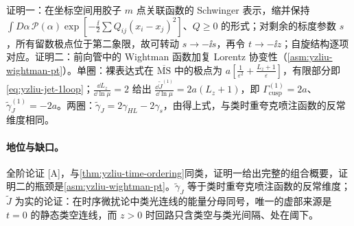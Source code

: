 \begin{proofsketch}
证明一\cite[附录~C.1]{Ji:2023pba}：在坐标空间用胶子 $m$ 点关联函数的 Schwinger 表示，缩并保持 $\int D\alpha\,\mathcal P(\alpha)\exp[-\frac\ii2\sum Q_{ij}(x_i-x_j)^2]$、$Q\ge0$ 的形式；对剩余的标度参数 $s$，所有留数极点位于第二象限，故可转动 $s\to-\ii s$，再令 $t\to-\ii z$；自旋结构逐项对应\cite[式~(C.19)--(C.21)]{Ji:2023pba}。证明二\cite[附录~C.2]{Ji:2023pba}：前向管中的 Wightman 函数加复 Lorentz 协变性（\cref{asm:yzliu-wightman-pt}）。单圈：裸表达式在 $\overline{\mathrm{MS}}$ 中的极点为 $a[\frac1{\varepsilon^2}+\frac{L_z+1}{\varepsilon}]$，有限部分即\cref{eq:yzliu-jet-1loop}；$\frac{\dd L_z}{\dd\ln\mu}=2$ 给出 $\frac{\dd\tilde J^{(1)}}{\dd\ln\mu}=2a(L_z+1)$，即 $\Gamma^{(1)}_{\mathrm{cusp}}=2a$、$\tilde\gamma^{(1)}_J=-2a$。两圈：$\tilde\gamma_J=2\gamma_{HL}-2\gamma_s$，由\cite[式~(A.4)--(A.5)]{Ji:2023pba}得上式，与类时重夸克喷注函数的反常维度相同。
\end{proofsketch}

\paragraph{地位与缺口。}全阶论证 [A]，与\cref{thm:yzliu-time-ordering}同类，证明一给出完整的组合概要，证明二的瓶颈是\cref{asm:yzliu-wightman-pt}。$\tilde\gamma_J$ 等于类时重夸克喷注函数的反常维度；$\tilde J$ 为实的论证：在时序微扰论中类光连线的能量分母同号，唯一的虚部来源是 $t=0$ 的静态类空连线，而 $z>0$ 时回路只含类空与类光间隔、处在阈下。

